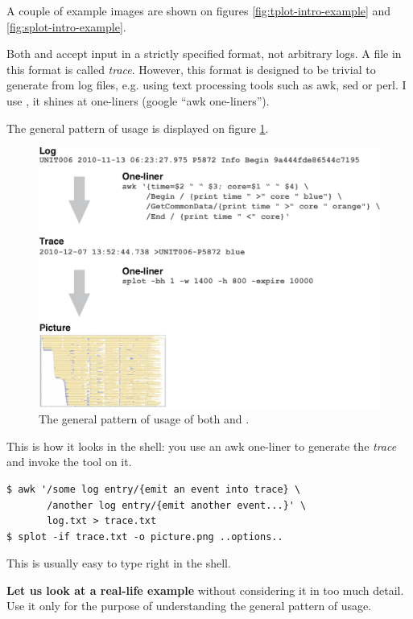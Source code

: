 \documentclass{article}
\begin{document}
A couple of example images are shown on figures \ref{fig:tplot-intro-example} and \ref{fig:splot-intro-example}.

\label{sec:general-usage}
Both \timeplot{} and \splot{} accept input in a strictly specified format, not arbitrary logs. A file in this format is called \emph{trace}. However, this format is designed to be trivial to generate from log files, e.g. using text processing tools such as awk, sed or perl. I use \awk{}, it shines at one-liners (google ``awk one-liners'').

The general pattern of usage is displayed on figure \ref{fig:general-usage}.

\begin{figure}[t]
\center
\includegraphics[width=\textwidth]{general-usage.pdf}
\caption{The general pattern of usage of both \timeplot{} and \splot{}.}
\label{fig:general-usage}
\end{figure}

This is how it looks in the shell: you use an awk one-liner to generate the \emph{trace} and invoke the tool on it.

\begin{verbatim}
$ awk '/some log entry/{emit an event into trace} \
       /another log entry/{emit another event...}' \
       log.txt > trace.txt
$ splot -if trace.txt -o picture.png ..options..
\end{verbatim}

This is usually easy to type right in the shell.

\textbf{Let us look at a real-life example} without considering it in too much detail. Use it only for the purpose of understanding the general pattern of usage.
\pagebreak
\end{document}
